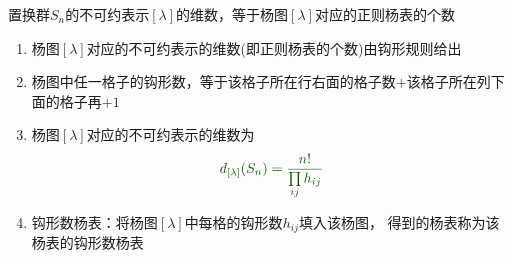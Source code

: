 \begin{newthem}[维数定理]
{\color{seco}置换群$S_n$的不可约表示$[\lambda]$的维数，等于杨图$[\lambda]$对应的正则杨表的个数}
\end{newthem}

\begin{note}
	\begin{enumerate}
		\item 
		杨图$[\lambda]$对应的不可约表示的维数(即正则杨表的个数)由钩形规则给出
		\item 
		杨图中任一格子的钩形数，等于该格子所在行右面的格子数$+$该格子所在列下面的格子再$+1$
		\item 
		杨图$[\lambda]$对应的不可约表示的维数为
		\begin{equation}\begin{aligned}
		{\color{seco}d_{[\lambda]}(S_n)=\frac{n!}{\prod\limits_{ij}h_{ij}}}
		\end{aligned}\end{equation}
		\item 
		{\color{seco}钩形数杨表}：将杨图$[\lambda]$中每格的钩形数$h_{ij}$填入该杨图，
		得到的杨表称为该杨表的钩形数杨表
	\end{enumerate}
\end{note}


